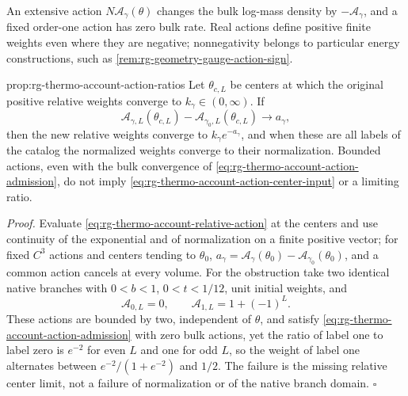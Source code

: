 An extensive action $N\mathscr A_\gamma(\theta)$ changes the bulk log-mass
density by $-\mathscr A_\gamma$, and a fixed order-one action has zero bulk
rate. Real actions define positive finite weights even where they are
negative; nonnegativity belongs to particular energy constructions, such as
\cref{rem:rg-geometry-gauge-action-sign}.

{prop:rg-thermo-account-action-ratios}
Let $\theta_{c,L}$ be centers at which the original positive relative weights
converge to $k_\gamma\in(0,\infty)$. If
\begin{equation}
 \mathscr A_{\gamma,L}(\theta_{c,L})-
 \mathscr A_{\gamma_0,L}(\theta_{c,L})\longrightarrow a_\gamma,
 \label{eq:rg-thermo-account-action-center-input}
\end{equation}
then the new relative weights converge to $k_\gamma e^{-a_\gamma}$, and when
these are all labels of the catalog the normalized weights converge to their
normalization. Bounded actions, even with the bulk convergence of
\cref{eq:rg-thermo-account-action-admission}, do not imply
\cref{eq:rg-thermo-account-action-center-input} or a limiting ratio.

\noindent\emph{Proof.}
Evaluate \cref{eq:rg-thermo-account-relative-action} at the centers and use
continuity of the exponential and of normalization on a finite positive
vector; for fixed $C^3$ actions and centers tending to $\theta_0$,
$a_\gamma=\mathscr A_\gamma(\theta_0)-\mathscr A_{\gamma_0}(\theta_0)$, and a
common action cancels at every volume. For the obstruction take two identical
native branches with $0<b<1$, $0<t<1/12$, unit initial weights, and
\begin{equation}
 \mathscr A_{0,L}=0,\qquad
 \mathscr A_{1,L}=1+(-1)^L.
 \label{eq:rg-thermo-account-alternating-action}
\end{equation}
These actions are bounded by two, independent of $\theta$, and satisfy
\cref{eq:rg-thermo-account-action-admission} with zero bulk actions, yet the
ratio of label one to label zero is $e^{-2}$ for even $L$ and one for odd $L$,
so the weight of label one alternates between $e^{-2}/(1+e^{-2})$ and $1/2$.
The failure is the missing relative center limit, not a failure of
normalization or of the native branch domain. $\square$
